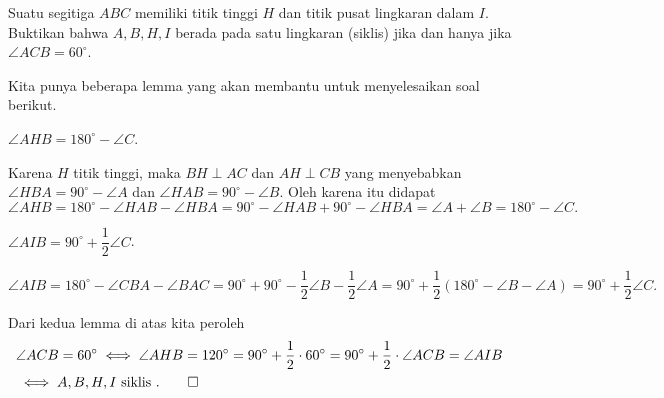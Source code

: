 \documentclass[11pt]{scrartcl}
\begin{document}
	\begin{soalbaru} 
		Suatu segitiga $ABC$ memiliki titik tinggi $H$ dan titik pusat lingkaran dalam $I$. Buktikan bahwa $A,B,H,I$ berada pada satu lingkaran (siklis) jika dan hanya jika $\angle ACB = 60^\circ$.\\[-10pt]
		\begin{solusi}
		Kita punya beberapa lemma yang akan membantu untuk menyelesaikan soal berikut.
		\begin{lemmarev}
		$\angle AHB = 180^\circ - \angle C$.
		
		\begin{buktilemma}
		Karena $H$ titik tinggi, maka $BH \perp AC$ dan $AH \perp CB$ yang menyebabkan $\angle HBA = 90^\circ  -\angle A$ dan $\angle HAB = 90^\circ - \angle B$. Oleh karena itu didapat $\angle AHB = 180^\circ - \angle HAB - \angle HBA = 90^\circ - \angle HAB + 90^\circ - \angle HBA = \angle A + \angle B = 180^\circ - \angle C.$
		\end{buktilemma}
		\end{lemmarev}
		
		\begin{lemmarev}
		$\angle AIB = 90^\circ + \dfrac{1}{2}\angle C$.
		\begin{buktilemma}
		$\angle AIB = 180^\circ - \angle CBA - \angle BAC = 90^\circ + 90^\circ - \dfrac{1}{2}\angle B - \dfrac{1}{2}\angle A = 90^\circ + \dfrac{1}{2}(180^\circ-\angle B-\angle A)=90^\circ+\dfrac{1}{2}\angle C.$
		\end{buktilemma}

			
		
		\end{lemmarev}
		
		Dari kedua lemma di atas kita peroleh
		\begin{align*}
				&\angle ACB = 60^\circ \iff \angle AHB = 120^\circ = 90^\circ + \dfrac{1}{2}\cdot 60^\circ = 90^\circ + \dfrac{1}{2}\cdot \angle ACB= \angle AIB\\
				&\iff  A,B,H,I \text{ siklis }. \qed
				\end{align*}
		\end{solusi}
	\end{soalbaru}
\end{document}
